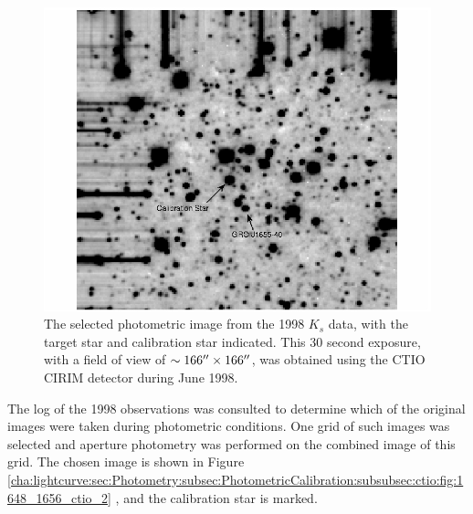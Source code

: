 \begin{figure}[!htb]
\begin{center}
\includegraphics[width=5.0in]{1648_1656_ctio_2}
\caption{%
The selected photometric image from the 1998 $K_s$ data, with the
target star and calibration star indicated. This 30 second exposure,
with a field of view of $\sim 166\hbox{$^{\prime\prime}$} \times 166\hbox{$^{\prime\prime}$} $, was
obtained using the CTIO CIRIM detector during June 1998. }\label{cha:lightcurve:sec:Photometry:subsec:PhotometricCalibration:subsubsec:ctio:fig:1648_1656_ctio_2}
\end{center}
\end{figure}

\vspace{\myparskip}

The log of the 1998 observations was consulted to determine
which of the original images were taken during photometric
conditions. One grid of such images was selected and aperture
photometry was performed on the combined image of this grid. The chosen image is shown in Figure~%
\vref{cha:lightcurve:sec:Photometry:subsec:PhotometricCalibration:subsubsec:ctio:fig:1648_1656_ctio_2}%
, and the calibration star is marked. %

\vspace{\myparskip}

